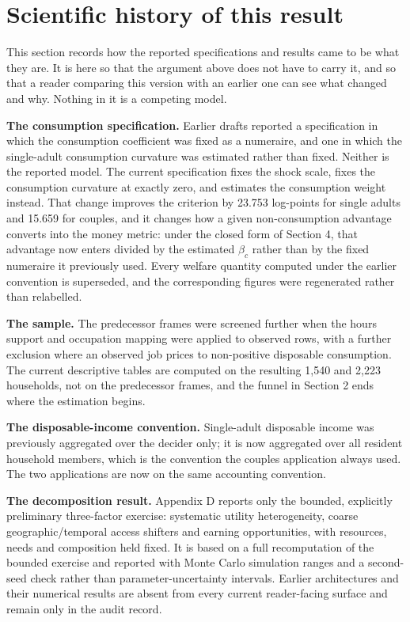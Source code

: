 \documentclass[11pt,a4paper]{article}
\begin{document}
\section{Scientific history of this result}\label{scientific-history-of-this-result}

This section records how the reported specifications and results came to be what they are. It is here so that the argument above does not have to carry it, and so that a reader comparing this version with an earlier one can see what changed and why. Nothing in it is a competing model.

\textbf{The consumption specification.} Earlier drafts reported a specification in which the consumption coefficient was fixed as a numeraire, and one in which the single-adult consumption curvature was estimated rather than fixed. Neither is the reported model. The current specification fixes the shock scale, fixes the consumption curvature at exactly zero, and estimates the consumption weight instead. That change improves the criterion by 23.753 log-points for single adults and 15.659 for couples, and it changes how a given non-consumption advantage converts into the money metric: under the closed form of Section 4, that advantage now enters divided by the estimated \(\beta_c\) rather than by the fixed numeraire it previously used. Every welfare quantity computed under the earlier convention is superseded, and the corresponding figures were regenerated rather than relabelled.

\textbf{The sample.} The predecessor frames were screened further when the hours support and occupation mapping were applied to observed rows, with a further exclusion where an observed job prices to non-positive disposable consumption. The current descriptive tables are computed on the resulting 1,540 and 2,223 households, not on the predecessor frames, and the funnel in Section 2 ends where the estimation begins.

\textbf{The disposable-income convention.} Single-adult disposable income was previously aggregated over the decider only; it is now aggregated over all resident household members, which is the convention the couples application always used. The two applications are now on the same accounting convention.

\textbf{The decomposition result.} Appendix D reports only the bounded, explicitly preliminary three-factor exercise: systematic utility heterogeneity, coarse geographic/temporal access shifters and earning opportunities, with resources, needs and composition held fixed. It is based on a full recomputation of the bounded exercise and reported with Monte Carlo simulation ranges and a second-seed check rather than parameter-uncertainty intervals. Earlier architectures and their numerical results are absent from every current reader-facing surface and remain only in the audit record.
\end{document}
